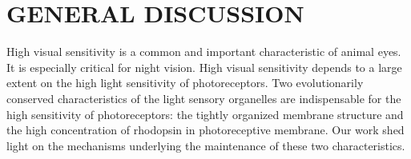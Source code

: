 \chapter{GENERAL DISCUSSION} 
\newpage
High visual sensitivity is a common and important characteristic of animal eyes. It is especially critical for night vision. High visual sensitivity depends to a large extent on the high light sensitivity of photoreceptors. Two evolutionarily conserved characteristics of the light sensory organelles are indispensable for the high sensitivity of photoreceptors: the tightly organized membrane structure and the high concentration of rhodopsin in photoreceptive membrane. Our work shed light on the mechanisms underlying the maintenance of these two characteristics.